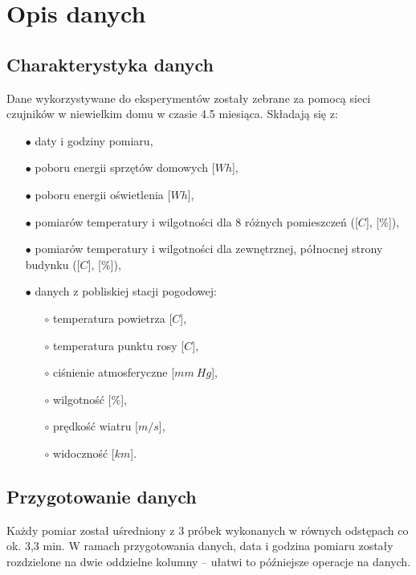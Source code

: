 \documentclass[a4paper,11pt,twoside]{mwrep}  %
\begin{document}
\begingroup
\let\clearpage\relax
\chapter{Opis danych}

\section{Charakterystyka danych}

Dane wykorzystywane do eksperymentów zostały zebrane za pomocą sieci czujników w niewielkim domu w czasie 4.5 miesiąca. 
Składają się z:
\begin{itemize}
\item[$\bullet$] daty i godziny pomiaru,
\item[$\bullet$] poboru energii sprzętów domowych [$Wh$],
\item[$\bullet$] poboru energii oświetlenia [$Wh$],
\item[$\bullet$] pomiarów temperatury i wilgotności dla 8 różnych pomieszczeń ([\degree $C$], [$\%$]),
\item[$\bullet$] pomiarów temperatury i wilgotności dla zewnętrznej, północnej strony budynku ([\degree $C$], [$\%$]),
\item[$\bullet$] danych z pobliskiej stacji pogodowej:
	\begin{itemize}
	\item[$\circ$] temperatura powietrza [\degree $C$],
	\item[$\circ$] temperatura punktu rosy [\degree $C$],
	\item[$\circ$] ciśnienie atmosferyczne [$mm~Hg$],
	\item[$\circ$] wilgotność [$\%$],
	\item[$\circ$] prędkość wiatru [$m/s$],
	\item[$\circ$] widoczność [$km$].
	\end{itemize}
\end{itemize}

\section{Przygotowanie danych}
Każdy pomiar został uśredniony z 3 próbek wykonanych w równych odstępach co ok. 3,3 min. W ramach przygotowania danych, data i godzina pomiaru zostały rozdzielone na dwie oddzielne kolumny -- ułatwi to późniejsze operacje na danych.
\endgroup


\clearpage
\end{document}
